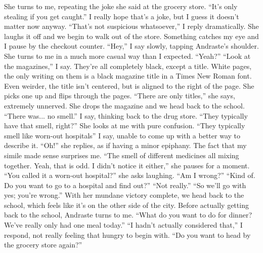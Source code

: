 \documentclass[a4paper, 12pt]{book}
\newcommand\tab[1][1cm]{\hspace*{#1}}
\begin{document}
\newline
\tab
She turns to me, repeating the joke she said at the grocery store. ``It’s only stealing if you get caught.'' I really hope that’s a joke, but I guess it doesn’t matter now anyway.
\newline
\tab
``That’s not suspicious whatsoever,'' I reply dramatically. She laughs it off and we begin to walk out of the store. Something catches my eye and I pause by the checkout counter. ``Hey,'' I say slowly, tapping Andraste’s shoulder.
\newline
\tab
She turns to me in a much more casual way than I expected. ``Yeah?''
\newline
\tab
``Look at the magazines,'' I say. They’re all completely black, except a title. White pages, the only writing on them is a black magazine title in a Times New Roman font. Even weirder, the title isn’t centered, but is aligned to the right of the page.
\newline
\tab
She picks one up and flips through the pages. ``There are only titles,'' she says, extremely unnerved. She drops the magazine and we head back to the school.
\newline
\tab
``There was... no smell.'' I say, thinking back to the drug store. ``They typically have that smell, right?''  She looks at me with pure confusion. ``They typically smell like worn-out hospitals'' I say, unable to come up with a better way to describe it.
\newline
\tab
``Oh!'' she replies, as if having a minor epiphany. The fact that my simile made sense surprises me. ``The smell of different medicines all mixing together. Yeah, that is odd. I didn’t notice it either,'' she pauses for a moment. ``You called it a worn-out hospital?'' she asks laughing.
\newline
\tab
``Am I wrong?''
\newline
\tab
``Kind of. Do you want to go to a hospital and find out?''
\newline
\tab
``Not really.''
\newline
\tab
``So we’ll go with yes; you’re wrong.'' With her mundane victory complete, we head back to the school, which feels like it’s on the other side of the city. Before actually getting back to the school, Andraste turns to me. ``What do you want to do for dinner? We’ve really only had one meal today.''
\newline
\tab
``I hadn’t actually considered that,'' I respond, not really feeling that hungry to begin with. ``Do you want to head by the grocery store again?''
\end{document}
